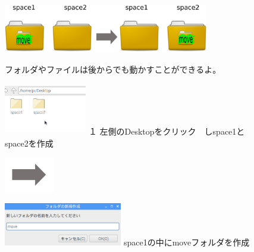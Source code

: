 \documentclass[a4paper,12pt]{jarticle}
\begin{document}
\begin{figure}[ht]
\centering
\includegraphics[width=0.8\textwidth]{fig15-1.eps}
\begin{minipage}{15.297cm}
フォルダやファイルは後からでも動かすことができるよ。
\end{minipage}

\begin{minipage}{5.963cm}
\includegraphics[width=3.604cm,height=2.268cm]{textbook-img051.png}
	{\flushleft
１
左側のDesktopをクリック　しspace1とspace2を作成
	}
\end{minipage}
\includegraphics[width=2.168cm,height=1.542cm]{textbook-img052.png}
\begin{minipage}{7.473cm}
\includegraphics[width=5.166cm,height=1.882cm]{textbook-img050.png}
	{ space1の中にmoveフォルダを作成
	}
\end{minipage}


\end{figure}
\end{document}
